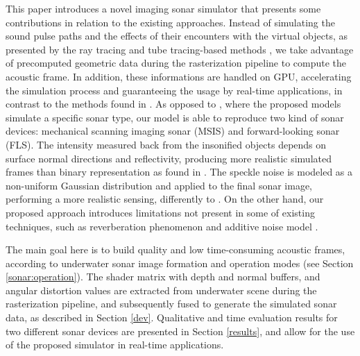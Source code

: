 \documentclass[final,5p,times]{elsarticle}
\begin{document}
This paper introduces a novel imaging sonar simulator that presents some
contributions in relation to the existing approaches. Instead of simulating
the sound pulse paths and the effects of their encounters with the virtual
objects, as presented by the ray tracing and tube tracing-based methods
\cite{bell1997,coiras2009,gueriot2010,sac2015,demarco2015,gu2013,kwak2015},
we take advantage of precomputed geometric data during the rasterization
pipeline to compute the acoustic frame. In addition, these informations are
handled on GPU, accelerating the simulation process and guaranteeing the
usage by real-time applications, in contrast to the methods found in
\cite{bell1997,coiras2009,sac2015,demarco2015}. As opposed to
\cite{bell1997,coiras2009,gueriot2010,sac2015,demarco2015,gu2013,kwak2015}, where
the proposed models simulate a specific sonar type, our model is able to
reproduce two kind of sonar devices: mechanical scanning imaging sonar (MSIS)
and forward-looking sonar (FLS). The intensity measured back from the
insonified objects depends on surface normal directions and reflectivity,
producing more realistic simulated frames than binary representation as
found in \cite{gu2013,kwak2015}. The speckle noise is modeled as a non-uniform
Gaussian distribution and applied to the final sonar image, performing a more
realistic sensing, differently to
\cite{gueriot2010,sac2015,demarco2015,gu2013,kwak2015}. On the other hand,
our proposed approach introduces limitations not present in some of existing
techniques, such as reverberation phenomenon \cite{sac2015} and additive
noise model \cite{sac2015,demarco2015}.

The main goal here is to build quality and low time\hyp{}consuming acoustic
frames, according to underwater sonar image formation and operation modes
(see Section \ref{sonar:operation}). The shader matrix with depth and normal
buffers, and angular distortion values are extracted from underwater scene
during the rasterization pipeline, and subsequently fused to generate the
simulated sonar data, as described in Section \ref{dev}. Qualitative and
time evaluation results for two different sonar devices are presented in
Section \ref{results}, and allow for the use of the proposed simulator in
real-time applications.
\end{document}
